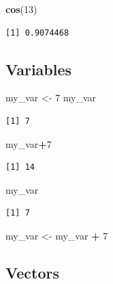\documentclass[]{book}
\newenvironment{Shaded}{\begin{snugshade}}{\end{snugshade}}
\newcommand{\KeywordTok}[1]{\textcolor[rgb]{0.13,0.29,0.53}{\textbf{#1}}}
\newcommand{\DecValTok}[1]{\textcolor[rgb]{0.00,0.00,0.81}{#1}}
\newcommand{\StringTok}[1]{\textcolor[rgb]{0.31,0.60,0.02}{#1}}
\newcommand{\OperatorTok}[1]{\textcolor[rgb]{0.81,0.36,0.00}{\textbf{#1}}}
\newcommand{\NormalTok}[1]{#1}
\theoremstyle{definition}
\theoremstyle{definition}
\theoremstyle{definition}
\theoremstyle{remark}
\begin{document}
\begin{Shaded}
\begin{Highlighting}[]
\KeywordTok{cos}\NormalTok{(}\DecValTok{13}\NormalTok{)}
\end{Highlighting}
\end{Shaded}

\begin{verbatim}
[1] 0.9074468
\end{verbatim}

\subsection{Variables}\label{variables}

\begin{Shaded}
\begin{Highlighting}[]
\NormalTok{my_var <-}\StringTok{ }\DecValTok{7}
\NormalTok{my_var}
\end{Highlighting}
\end{Shaded}

\begin{verbatim}
[1] 7
\end{verbatim}

\begin{Shaded}
\begin{Highlighting}[]
\NormalTok{my_var}\OperatorTok{+}\DecValTok{7}
\end{Highlighting}
\end{Shaded}

\begin{verbatim}
[1] 14
\end{verbatim}

\begin{Shaded}
\begin{Highlighting}[]
\NormalTok{my_var}
\end{Highlighting}
\end{Shaded}

\begin{verbatim}
[1] 7
\end{verbatim}

\begin{Shaded}
\begin{Highlighting}[]
\NormalTok{my_var <-}\StringTok{ }\NormalTok{my_var }\OperatorTok{+}\StringTok{ }\DecValTok{7}
\end{Highlighting}
\end{Shaded}

\subsection{Vectors}\label{vectors}
\end{document}
